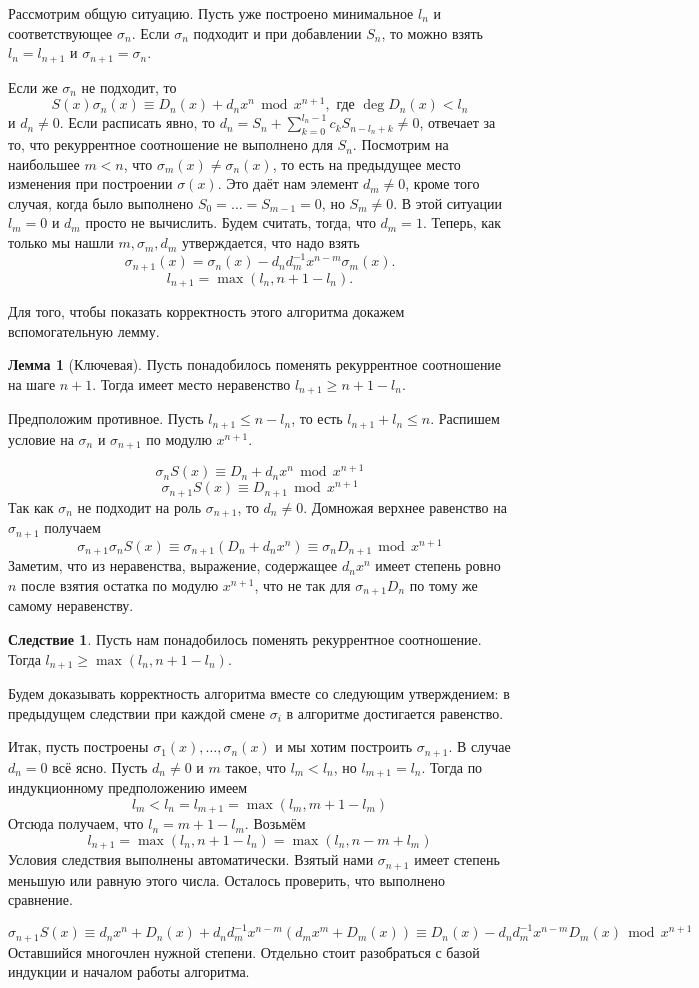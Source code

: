 \documentclass[12pt,a4paper,oneside]{book}
\theoremstyle{definition}
\newtheorem{lem}{\color{green!50!black}Лемма}
\newtheorem{cor}{\color{green!45!black}Следствие}
\renewcommand{\leq}{\leqslant}
\renewcommand{\geq}{\geqslant}
\renewcommand{\mod}{\,\operatorname{mod}\,}
\def\lm{\begin{lem}}
\def\elm{\end{lem}}
\def\crl{\begin{cor}}
\def\ecrl{\end{cor}}
\begin{document}
Рассмотрим общую ситуацию. Пусть уже построено минимальное $l_n$ и соответствующее $\sigma_n$. Если $\sigma_n$ подходит и при добавлении $S_n$, то можно взять $l_n=l_{n+1}$ и $\sigma_{n+1}=\sigma_n$. 

Если же $\sigma_n$ не подходит, то
$$ S(x)\sigma_n(x) \equiv D_n(x)+d_nx^n \mod x^{n+1}, \text{ где } \deg D_n(x) < l_n$$
и $d_n\neq 0$. Если расписать явно, то $d_n=S_n+\sum_{k=0}^{l_n-1} c_k S_{n-l_n+k} \neq 0$, отвечает за то, что рекуррентное соотношение не выполнено для $S_n$. Посмотрим на наибольшее $m<n$, что $\sigma_m(x)\neq \sigma_n(x)$, то есть на предыдущее место изменения при построении $\sigma(x)$. Это даёт нам элемент $d_m\neq 0$, кроме того случая, когда было выполнено $S_0=\dots=S_{m-1}=0$, но $S_m\neq 0$. В этой ситуации $l_m=0$ и $d_m$ просто не вычислить. Будем считать, тогда, что $d_m=1$. Теперь, как только мы нашли $m,\sigma_m,d_m$ утверждается, что надо взять 
$$\sigma_{n+1}(x)= \sigma_n(x) - d_n d_m^{-1} x^{n-m} \sigma_m(x).$$
$$l_{n+1}=\max(l_n,n+1-l_n).$$

Для того, чтобы показать корректность этого алгоритма докажем вспомогательную лемму.

\lm[Ключевая] Пусть понадобилось поменять рекуррентное соотношение на шаге $n+1$. Тогда имеет место неравенство $l_{n+1}\geq n+1-l_n$. 
\elm
\proof  Предположим противное. Пусть $l_{n+1}\leq n-l_n$, то есть $l_{n+1}+l_n\leq n$. Распишем условие на $\sigma_n$ и $\sigma_{n+1}$ по модулю $x^{n+1}$.

$$\sigma_n S(x) \equiv D_n+d_nx^n \mod x^{n+1}$$
$$\sigma_{n+1}S(x)\equiv D_{n+1} \mod x^{n+1}$$
Так как $\sigma_n$ не подходит на роль $\sigma_{n+1}$, то $d_n\neq 0$. Домножая верхнее равенство на $\sigma_{n+1}$ получаем
$$ \sigma_{n+1}\sigma_n S(x) \equiv \sigma_{n+1}(D_n+d_nx^n) \equiv \sigma_n D_{n+1}\mod x^{n+1}$$
Заметим, что из неравенства, выражение, содержащее $d_nx^n$ имеет степень ровно $n$ после взятия остатка по модулю $x^{n+1}$, что не так для $\sigma_{n+1}D_n$ по тому же самому неравенству.
\endproof


\crl Пусть нам понадобилось поменять рекуррентное соотношение. Тогда $l_{n+1}\geq \max (l_n, n+1-l_n)$.
\ecrl

Будем доказывать корректность алгоритма вместе со следующим утверждением: в предыдущем следствии при каждой смене $\sigma_i$ в алгоритме достигается равенство. 

Итак, пусть построены $\sigma_1(x),\dots, \sigma_n(x)$ и мы хотим построить $\sigma_{n+1}$.
В случае $d_n=0$ всё ясно. Пусть $d_n \neq 0$ и $m$ такое, что $l_m<l_n$, но $l_{m+1}=l_n$. Тогда по индукционному предположению имеем 
$$l_m<l_n = l_{m+1}=\max (l_m,m+1-l_m) $$
Отсюда получаем, что $l_n=m+1-l_m$. Возьмём
$$l_{n+1}=\max (l_n,n+1-l_n)=\max (l_n,n-m+l_m)$$
Условия следствия выполнены автоматически. Взятый нами $\sigma_{n+1}$ имеет степень меньшую или равную этого числа. Осталось проверить, что выполнено сравнение. 

$$\sigma_{n+1}S(x)\equiv d_n x^n+ 
D_n(x)+ d_nd_m^{-1}x^{n-m}(d_mx^m+ D_m(x)) \equiv D_n(x)-d_nd_m^{-1}x^{n-m}D_m(x) \mod x^{n+1}
$$
Оставшийся многочлен нужной степени. Отдельно стоит разобраться с базой индукции и началом работы алгоритма.
 

\endproof
\end{document}

